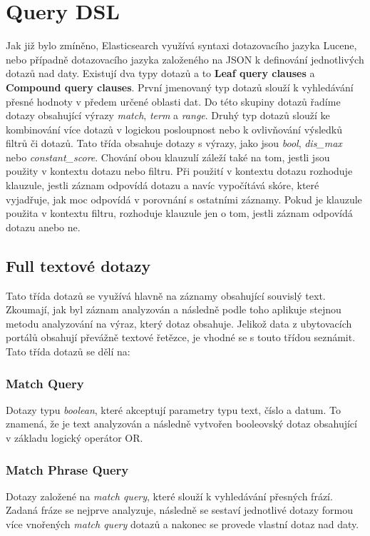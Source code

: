 \documentclass[czech,BP]{thesiskiv}
\begin{document}
\section{Query DSL}
Jak již bylo zmíněno, Elasticsearch využívá syntaxi dotazovacího jazyka Lucene, nebo případně dotazovacího jazyka založeného na JSON k definování jednotlivých dotazů nad daty. Existují dva typy dotazů a to \textbf{Leaf query clauses} a \textbf{Compound query clauses}. První jmenovaný typ dotazů slouží k vyhledávání přesné hodnoty v předem určené oblasti dat. Do této skupiny dotazů řadíme dotazy obsahující výrazy \textit{match}, \textit{term} a \textit{range}. Druhý typ dotazů slouží ke kombinování více dotazů v logickou posloupnost nebo k ovlivňování výsledků filtrů či dotazů. Tato třída obsahuje dotazy s výrazy, jako jsou \textit{bool}, \textit{dis\_max} nebo \textit{constant\_score}. Chování obou klauzulí záleží také na tom, jestli jsou použity v kontextu dotazu nebo filtru. Při použití v kontextu dotazu rozhoduje klauzule, jestli záznam odpovídá dotazu a navíc vypočítává skóre, které vyjadřuje, jak moc odpovídá v porovnání s ostatními záznamy. Pokud je klauzule použita v kontextu filtru, rozhoduje klauzule jen o tom, jestli záznam odpovídá dotazu anebo ne. \cite{QueryDSL}

\subsection{Full textové dotazy}
Tato třída dotazů se využívá hlavně na záznamy obsahující souvislý text. Zkoumají, jak byl záznam analyzován a následně podle toho aplikuje stejnou metodu analyzování na výraz, který dotaz obsahuje. Jelikož data z ubytovacích portálů obsahují převážně textové řetězce, je vhodné se s touto třídou seznámit. Tato třída dotazů se dělí na:

\subsubsection{Match Query}
Dotazy typu \textit{boolean}, které akceptují parametry typu text, číslo a datum. To znamená, že je text analyzován a následně vytvořen booleovský dotaz obsahující v základu logický operátor OR.

\subsubsection{Match Phrase Query}
Dotazy založené na \textit{match query}, které slouží k vyhledávání přesných frází. Zadaná fráze se nejprve analyzuje, následně se sestaví jednotlivé dotazy formou více vnořených \textit{match query} dotazů a nakonec se provede vlastní dotaz nad daty.
\end{document}
